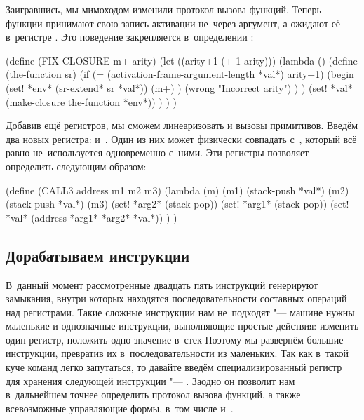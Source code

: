 Заигравшись, мы мимоходом изменили протокол вызова функций. Теперь функции
принимают свою запись активации не~через аргумент, а ожидают её в~регистре
. Это поведение закрепляется в~определении :

\begin{code:lisp}
(define (FIX-CLOSURE m+ arity)
  (let ((arity+1 (+ 1 arity)))
    (lambda ()
      (define (the-function sr)
        (if (= (activation-frame-argument-length *val*) arity+1)
            (begin (set! *env* (sr-extend* sr *val*))
                   (m+) )
            (wrong "Incorrect arity") ) )
      (set! *val* (make-closure the-function *env*)) ) ) )
\end{code:lisp}

Добавив ещё регистров, мы сможем линеаризовать и вызовы примитивов. Введём два
новых регистра:  и~. Один из них может физически совпадать
с~, который всё равно не~используется одновременно с~ними. Эти
регистры позволяет определить  следующим образом:

\begin{code:lisp}
(define (CALL3 address m1 m2 m3)
  (lambda (m)
    (m1)
    (stack-push *val*)
    (m2)
    (stack-push *val*)
    (m3)
    (set! *arg2* (stack-pop))
    (set! *arg1* (stack-pop))
    (set! *val* (address *arg1* *arg2* *val*)) ) )
\end{code:lisp}


\subsection{Дорабатываем инструкции}\label{compilation/bytes/ssect:customize}

В~данный момент рассмотренные двадцать пять инструкций генерируют замыкания,
внутри которых находятся последовательности составных операций над регистрами.
Такие сложные инструкции нам не~подходят "--- машине нужны маленькие и
однозначные инструкции, выполняющие простые действия: изменить один регистр,
положить одно значение в~стек {\itp} Поэтому мы развернём большие инструкции,
превратив их в~последовательности из маленьких. Так как в~такой куче команд
легко запутаться, то давайте введём специализированный регистр для хранения
следующей инструкции  "--- . Заодно он позволит нам
в~дальнейшем точнее определить протокол вызова функций, а также всевозможные
управляющие формы, в~том числе и~.


